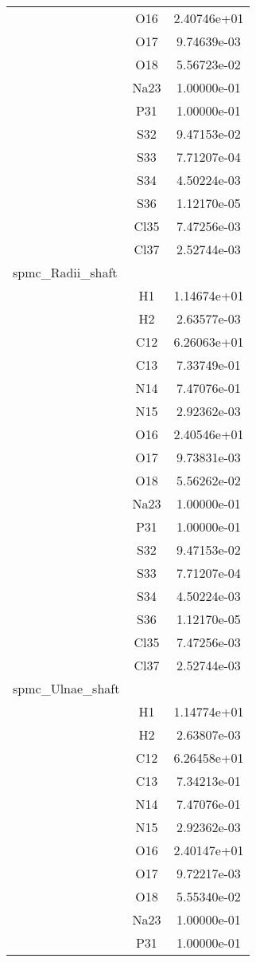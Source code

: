 \begin{centering}
\begin{longtable}{l c c}
& O16 & 2.40746e+01 \\ 
& O17 & 9.74639e-03 \\ 
& O18 & 5.56723e-02 \\ 
& Na23 & 1.00000e-01 \\ 
& P31 & 1.00000e-01 \\ 
& S32 & 9.47153e-02 \\ 
& S33 & 7.71207e-04 \\ 
& S34 & 4.50224e-03 \\ 
& S36 & 1.12170e-05 \\ 
& Cl35 & 7.47256e-03 \\ 
& Cl37 & 2.52744e-03 \\ 
\hline
spmc_Radii_shaft & & \\
\hline
& H1 & 1.14674e+01 \\ 
& H2 & 2.63577e-03 \\ 
& C12 & 6.26063e+01 \\ 
& C13 & 7.33749e-01 \\ 
& N14 & 7.47076e-01 \\ 
& N15 & 2.92362e-03 \\ 
& O16 & 2.40546e+01 \\ 
& O17 & 9.73831e-03 \\ 
& O18 & 5.56262e-02 \\ 
& Na23 & 1.00000e-01 \\ 
& P31 & 1.00000e-01 \\ 
& S32 & 9.47153e-02 \\ 
& S33 & 7.71207e-04 \\ 
& S34 & 4.50224e-03 \\ 
& S36 & 1.12170e-05 \\ 
& Cl35 & 7.47256e-03 \\ 
& Cl37 & 2.52744e-03 \\ 
\hline
spmc_Ulnae_shaft & & \\
\hline
& H1 & 1.14774e+01 \\ 
& H2 & 2.63807e-03 \\ 
& C12 & 6.26458e+01 \\ 
& C13 & 7.34213e-01 \\ 
& N14 & 7.47076e-01 \\ 
& N15 & 2.92362e-03 \\ 
& O16 & 2.40147e+01 \\ 
& O17 & 9.72217e-03 \\ 
& O18 & 5.55340e-02 \\ 
& Na23 & 1.00000e-01 \\ 
& P31 & 1.00000e-01 \\ 

\end{longtable}
\end{centering}
